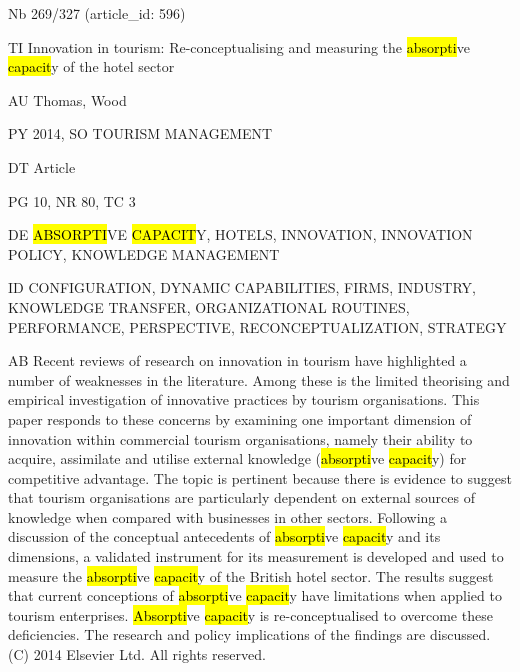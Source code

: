 \documentclass[a4paper]{article}
\begin{document}
\vspace*{-2cm}
Nb \tabto{0cm}269/327 (article\_id: 596)\par
TI \tabto{0cm}Innovation in tourism: Re-conceptualising and measuring the \hl{absorpti}ve \hl{capacit}y of the hotel sector\par
AU \tabto{0cm}Thomas, Wood\par
PY \tabto{0cm}2014, SO TOURISM MANAGEMENT\par
DT \tabto{0cm}Article\par
PG \tabto{0cm}10, NR 80, TC 3\par
DE \tabto{0cm}\hl{ABSORPTI}VE \hl{CAPACIT}Y, HOTELS, INNOVATION, INNOVATION POLICY, KNOWLEDGE MANAGEMENT\par
ID \tabto{0cm}CONFIGURATION, DYNAMIC CAPABILITIES, FIRMS, INDUSTRY, KNOWLEDGE TRANSFER, ORGANIZATIONAL ROUTINES, PERFORMANCE, PERSPECTIVE, RECONCEPTUALIZATION, STRATEGY\par
AB \tabto{0cm}Recent reviews of research on innovation in tourism have highlighted a number of weaknesses in the literature. Among these is the limited theorising and empirical investigation of innovative practices by tourism organisations. This paper responds to these concerns by examining one important dimension of innovation within commercial tourism organisations, namely their ability to acquire, assimilate and utilise external knowledge (\hl{absorpti}ve \hl{capacit}y) for competitive advantage. The topic is pertinent because there is evidence to suggest that tourism organisations are particularly dependent on external sources of knowledge when compared with businesses in other sectors. Following a discussion of the conceptual antecedents of \hl{absorpti}ve \hl{capacit}y and its dimensions, a validated instrument for its measurement is developed and used to measure the \hl{absorpti}ve \hl{capacit}y of the British hotel sector. The results suggest that current conceptions of \hl{absorpti}ve \hl{capacit}y have limitations when applied to tourism enterprises. \hl{Absorpti}ve \hl{capacit}y is re-conceptualised to overcome these deficiencies. The research and policy implications of the findings are discussed. (C) 2014 Elsevier Ltd. All rights reserved.\par
\clearpage
\end{document}
